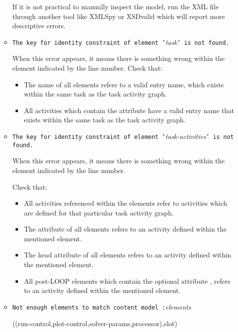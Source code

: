 \begin{itemize}
\begin{itemize}
  If it is not practical to manually inspect the model, run the XML
  file through another tool like XMLSpy or XSDvalid which will report
  more descriptive errors.
  
\item \texttt{The key for identity constraint of element '}\emph{task}\texttt{' is not found.}
  
  When this error appears, it means there is something wrong within
  the  element indicated by the line number.
  Check that:
  \begin{itemize}
  \item The name  of all
     elements refers to a valid entry name,
    which exists within the same task as the task activity
    graph.
  \item All activities which contain the attribute
     have a valid entry name that exists
    within the same task as the task activity
    graph.
  \end{itemize}

\item \texttt{The key for identity constraint of element
    '}\emph{task-activities}\texttt{' is not found.}
  
  When this error appears, it means there is something wrong within
  the  element indicated by the line
  number.

  Check that:
  \begin{itemize}
  \item All activities referenced within the
     elements refer to activities which are
    defined for that particular task activity
    graph.
  \item The  attribute of all
     elements
    refers to an activity defined within the mentioned
     element.
  \item The head attribute of all  elements
    refers to an activity defined within the mentioned
     element.
  \item All post-LOOP elements which contain the optional attribute
    , refers to an activity defined within the
    mentioned  element.
  \end{itemize}

\item \texttt{Not enough elements to match content model :}\emph{elements}

  ((run-control,plot-control,solver-params,processor),slot)
\end{itemize}
\end{itemize}
